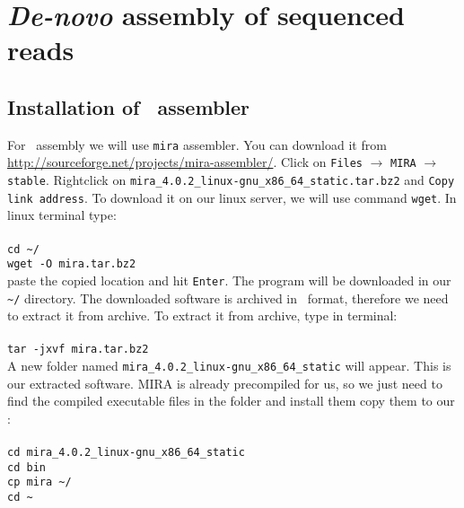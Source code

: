 \section{\textit{De-novo} assembly of sequenced reads}
\subsection{Installation of \denovo~assembler}
For \denovo~assembly we will use \texttt{mira} assembler.
You can download it from \url{http://sourceforge.net/projects/mira-assembler/}.
Click on \texttt{Files} $\rightarrow$ \texttt{MIRA} $\rightarrow$ \texttt{stable}. Rightclick on \texttt{mira\_4.0.2\_linux-gnu\_x86\_64\_static.tar.bz2}
and \texttt{Copy link address}.
To download it on our linux server, we will use command \texttt{wget}. In linux terminal type: \\~\\
\texttt{cd \textasciitilde/\progDir} \\
\texttt{wget -O mira.tar.bz2} \\

paste the copied location and hit \texttt{Enter}.
The program will be downloaded in our \texttt{\textasciitilde/\progDir} directory. 
The downloaded software is archived in \tarbz~format, therefore we need to extract it from archive.
To extract it from archive, type in terminal:\\~\\
\texttt{tar -jxvf mira.tar.bz2}\\

A new folder named \texttt{mira\_4.0.2\_linux-gnu\_x86\_64\_static} will appear.
This is our extracted software.
MIRA is already precompiled for us, so we just need
to find the compiled executable files in the folder and install them copy them to our \binDir: \\~\\
\texttt{cd mira\_4.0.2\_linux-gnu\_x86\_64\_static} \\
\texttt{cd bin} \\
\texttt{cp mira \textasciitilde/\binDir} \\
\texttt{cd \textasciitilde} \\

